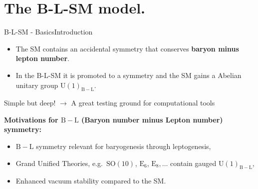 \documentclass[10pt,xcolor=dvipsnames,mathserif]{beamer}
\newcommand{\U}[1]{\mathrm{U}(1)_{\mathrm{#1}}}			%
\newcommand{\SO}[2]{\mathrm{SO}(#1)_{\mathrm{#2}}}		%
\newcommand{\E}[1]{\mathrm{E}_{#1}}		%
\newcommand{\blue}[0]{\color{blue}}
\newcommand{\green}[0]{\color{ForestGreen}}
\newcommand{\red}[0]{\color{red}}
\begin{document}
\section{The B-L-SM model.}
    \begin{frame}{B-L-SM - Basics}{Introduction}
        \begin{itemize}
            \item The SM contains an accidental symmetry that conserves {\blue \textbf{baryon minus lepton number}}. 
            \item In the {\blue B-L}-SM it is promoted to a symmetry and the SM gains a Abelian unitary group $\mathrm{U}(1)_{\mathrm{B-L}}$. 
        \end{itemize}
        \begin{center}
            {\red Simple but deep!} $\longrightarrow$ {\green A great testing ground for computational tools} 
        \end{center}
        
        \vskip2mm
        \textbf{Motivations for ${\mathrm{B-L}}$ (Baryon number minus Lepton number) symmetry:}
        \vskip2mm
        \begin{itemize}
        	\item $\mathrm{B-L}$ symmetry relevant for baryogenesis through leptogenesis,
        	\item Grand Unified Theories, e.g.~$\SO{10}{}$, $\E{6}$, $\E{8},\ldots$ contain gauged $\U{B-L}$,
			\item Enhanced vacuum stability compared to the SM.
        \end{itemize}
    \end{frame}
\end{document}
